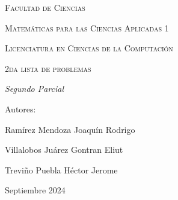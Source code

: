 \documentclass[oneside]{book}
\begin{document}
\begin{titlepage}
        \vspace{1cm}
        {\scshape\Large Facultad de Ciencias \par}
        \vspace{1cm}
        {\scshape\Large Matemáticas para las Ciencias Aplicadas 1 \par}
        \vspace{1cm}
        {\scshape\Large Licenciatura en Ciencias de la Computación \par}
        \vspace{1cm}
        {\scshape\Huge 2da lista de problemas  \par}
        \vspace{3cm}
        {\itshape\Large Segundo Parcial \par}
        \vfill
        {\Large Autores: \par}
        {\Large Ramírez Mendoza Joaquín Rodrigo \par}
        {\Large Villalobos Juárez Gontran Eliut\par}
        {\Large Treviño Puebla Héctor Jerome \par}
        \vfill
        {\Large Septiembre 2024 \par}
    \end{titlepage}
    \maketitle


\end{document}

